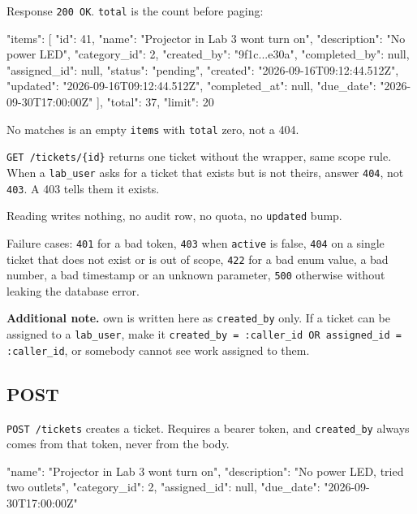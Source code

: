 \documentclass[12pt,letterpaper]{article}
\newenvironment{note}[1][Additional note]
  {\begin{notebox}\noindent\textbf{#1.}\space\ignorespaces}
  {\end{notebox}}
\begin{document}
Response \texttt{200 OK}. \texttt{total} is the count before paging:

\begin{code}
{
  "items": [
    {
      "id": 41,
      "name": "Projector in Lab 3 wont turn on",
      "description": "No power LED",
      "category_id": 2,
      "created_by": "9f1c...e30a",
      "completed_by": null,
      "assigned_id": null,
      "status": "pending",
      "created": "2026-09-16T09:12:44.512Z",
      "updated": "2026-09-16T09:12:44.512Z",
      "completed_at": null,
      "due_date": "2026-09-30T17:00:00Z"
    }
  ],
  "total": 37,
  "limit": 20
}
\end{code}

No matches is an empty \texttt{items} with \texttt{total} zero, not a 404.

\texttt{GET /tickets/\{id\}} returns one ticket without the wrapper, same scope
rule. When a \texttt{lab\_user} asks for a ticket that exists but is not theirs,
answer \texttt{404}, not \texttt{403}. A 403 tells them it exists.

Reading writes nothing, no audit row, no quota, no \texttt{updated} bump.

Failure cases: \texttt{401} for a bad token, \texttt{403} when \texttt{active}
is false, \texttt{404} on a single ticket that does not exist or is out of
scope, \texttt{422} for a bad enum value, a bad number, a bad timestamp or an
unknown parameter, \texttt{500} otherwise without leaking the database error.

\begin{note}
own is written here as \texttt{created\_by} only. If a ticket can be assigned to
a \texttt{lab\_user}, make it
\texttt{created\_by = :caller\_id OR assigned\_id = :caller\_id}, or somebody
cannot see work assigned to them.
\end{note}

\subsection{POST}

\texttt{POST /tickets} creates a ticket. Requires a bearer token, and
\texttt{created\_by} always comes from that token, never from the body.

\begin{code}
{
  "name": "Projector in Lab 3 wont turn on",
  "description": "No power LED, tried two outlets",
  "category_id": 2,
  "assigned_id": null,
  "due_date": "2026-09-30T17:00:00Z"
}
\end{code}
\end{document}
